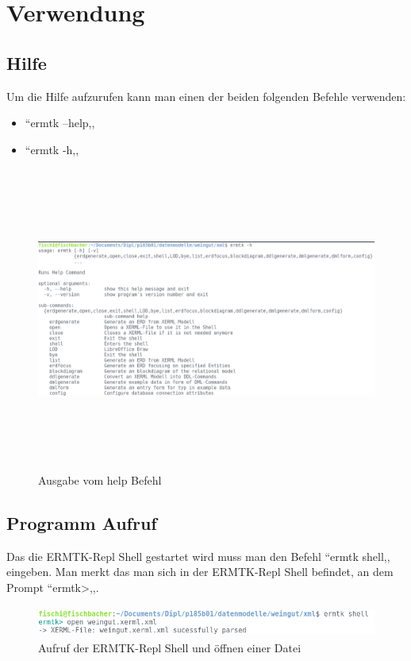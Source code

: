\section{Verwendung}
\fib{}
\subsection{Hilfe}
\noindent
Um die Hilfe aufzurufen kann man einen der beiden folgenden Befehle verwenden:
\begin{itemize}
    \item ``ermtk --help,,
    \item ``ermtk -h,,
\end{itemize}

\begin{figure}[H]
	\begin{center}
		\includegraphics[width=16cm, height=10cm]{images/ermtk_help.png}
		\caption{Ausgabe vom help Befehl}
		\label{dot}
	\end{center}
\end{figure}

\subsection{Programm Aufruf}
\fib{}
Das die ERMTK-Repl Shell gestartet wird muss man den Befehl ``ermtk shell,, eingeben. Man merkt das man sich in der ERMTK-Repl Shell befindet, an dem Prompt ``ermtk>,,.

\begin{figure}[H]
	\begin{center}
		\includegraphics[width=17 cm, height=1cm]{images/ermtk_shell.png}
		\caption{Aufruf der ERMTK-Repl Shell und öffnen einer Datei}
		\label{open}
	\end{center}
\end{figure}

